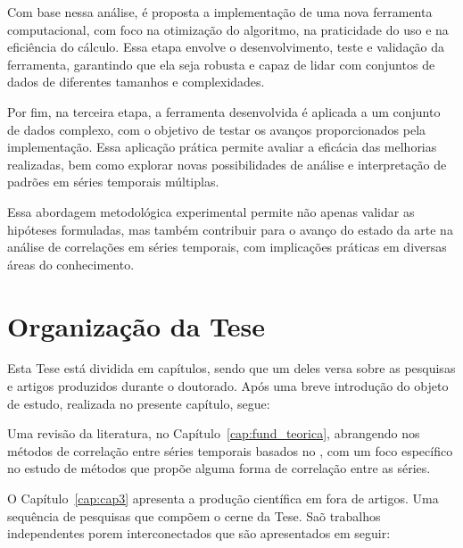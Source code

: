 Com base nessa análise, é proposta a implementação de uma nova ferramenta computacional, com foco na otimização do algoritmo, na praticidade do uso e na eficiência do cálculo. Essa etapa envolve o desenvolvimento, teste e validação da ferramenta, garantindo que ela seja robusta e capaz de lidar com conjuntos de dados de diferentes tamanhos e complexidades.

Por fim, na terceira etapa, a ferramenta desenvolvida é aplicada a um conjunto de dados complexo, com o objetivo de testar os avanços proporcionados pela implementação. Essa aplicação prática permite avaliar a eficácia das melhorias realizadas, bem como explorar novas possibilidades de análise e interpretação de padrões em séries temporais múltiplas.

Essa abordagem metodológica experimental permite não apenas validar as hipóteses formuladas, mas também contribuir para o avanço do estado da arte na análise de correlações em séries temporais, com implicações práticas em diversas áreas do conhecimento.

\section{Organização da Tese}
\label{sec:organizacao}

Esta Tese está dividida em capítulos, sendo que um deles versa sobre as pesquisas e artigos produzidos durante o doutorado. Após uma breve introdução do objeto de estudo, realizada no presente capítulo, segue:

Uma revisão da literatura, no Capítulo~\ref{cap:fund_teorica}, abrangendo nos métodos de correlação entre séries temporais basados no \dfa, com um foco específico no estudo de métodos que propõe alguma forma de correlação entre as séries.

O Capítulo~\ref{cap:cap3} apresenta a produção científica em fora de artigos. Uma sequência de pesquisas que compõem o cerne da Tese. Saõ trabalhos independentes porem interconectados que são apresentados em seguir:

